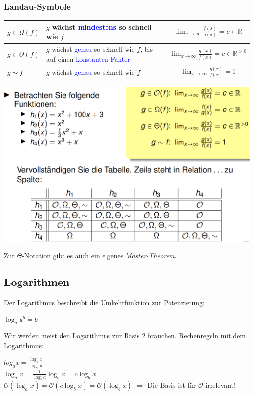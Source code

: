 \documentclass[12pt,a4paper]{article}
\begin{document}
\subsubsection{Landau-Symbole}
\begin{tabularx}{\textwidth}{|l|X|c|}
	\hline
	$g  \in  \Omega (f)$ & $g$ wächst \textcolor{blue}{mindestens} so schnell wie $f$ & $\lim_{x \to \infty} \frac{f(x)}{g(x)} = c \in \mathbb{R}$ \\
	\hline
	$g  \in  \Theta (f)$ & $g$ wächst \textcolor{blue}{genau} so schnell wie $f$, bis auf einen \textcolor{blue}{konstanten Faktor} & $\lim_{x \to \infty} \frac{g(x)}{f(x)} = c \in \mathbb{R}^{>0}$ \\
	\hline
	$g \sim f$ & $g$ wächst \textcolor{blue}{genau} so schnell wie $f$ & $\lim_{x \to \infty} \frac{g(x)}{f(x)} = 1$ \\
	\hline
\end{tabularx}
\begin{center}
	\includegraphics[scale=0.6]{Bilder/landau.PNG}
\end{center}
Zur $\Theta $-Notation gibt es auch ein eigenes \textit{\hyperref[sec:MasterLandau]{Master-Theorem}}.

\subsection{Logarithmen}
Der Logarithmus beschreibt die Umkehrfunktion zur Potenzierung:
\begin{center}
	$\log_a a^b = b$
\end{center}
Wir werden meist den Logarithmus zur Basis 2 brauchen.\newline
Rechenregeln mit dem Logarithmus:
\begin{center}
	$log_ax = \frac{\log_bx}{\log_ba}$\\
	\vspace*{.6cm}
	$\log_ax = \frac{1}{\log_ba}\log_bx = c\log_bx$\\
	\vspace*{.6cm}
	$\mathcal{O}(\log_ax) = \mathcal{O}(c\log_bx) = \mathcal{O}(\log_bx)$ $\Rightarrow $ Die Basis ist für $\mathcal{O}$ irrelevant!
\end{center}
\end{document}
